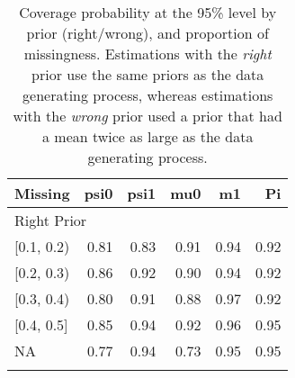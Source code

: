 \begin{table}[ht]
\centering
\begin{tabular}{lrrrrr}
  \toprule
Missing & psi0 & psi1 & mu0 & m1 & Pi \\ 
  \midrule
\multicolumn{6}{l}{Right Prior}\\
{[0.1, 0.2)} & 0.81 & 0.83 & 0.91 & 0.94 & 0.92 \\ 
  {[0.2, 0.3)} & 0.86 & 0.92 & 0.90 & 0.94 & 0.92 \\ 
  {[0.3, 0.4)} & 0.80 & 0.91 & 0.88 & 0.97 & 0.92 \\ 
  {[0.4, 0.5]} & 0.85 & 0.94 & 0.92 & 0.96 & 0.95 \\ 
  {NA} & 0.77 & 0.94 & 0.73 & 0.95 & 0.95 \\ 
   \bottomrule
\multicolumn{6}{l}{}\\
\end{tabular}
\caption{Coverage probability at the 95\% level by prior (right/wrong), and proportion of missingness. Estimations with the \emph{right} prior use the same priors as the data generating process, whereas estimations with the \emph{wrong} prior used a prior that had a mean twice as large as the data generating process.} 
\label{tab:coverage95-method-missigness}
\end{table}
